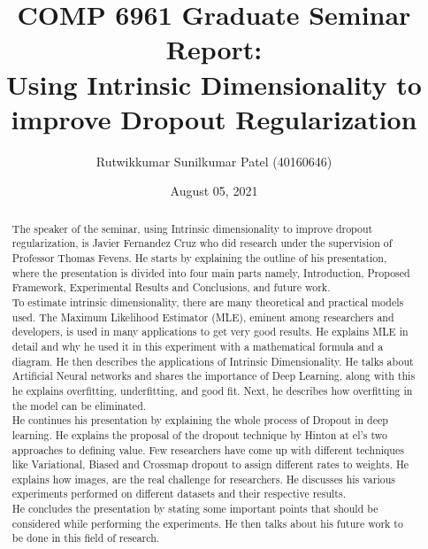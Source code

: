 \documentclass[12pt,letterpaper]{report}
\begin{document}
\title{COMP	6961 Graduate Seminar Report:\\[.5em]

Using Intrinsic Dimensionality to improve Dropout Regularization }
\author{Rutwikkumar Sunilkumar Patel (40160646) }
\date{August 05, 2021}
\maketitle




\begin{abstract}
    
The speaker of the seminar, using Intrinsic dimensionality to improve dropout regularization, is Javier Fernandez Cruz who did research under the supervision of Professor Thomas Fevens. He starts by explaining the outline of his presentation, where the presentation is divided into four main parts namely, Introduction, Proposed Framework, Experimental Results and Conclusions, and future work.  \\

To estimate intrinsic dimensionality, there are many theoretical and practical models used. The Maximum Likelihood Estimator (MLE), eminent among researchers and developers, is used in many applications to get very good results. He explains MLE in detail and why he used it in this experiment with a mathematical formula and a diagram. He then describes the applications of Intrinsic Dimensionality. He talks about Artificial Neural networks and shares the importance of Deep Learning, along with this he explains overfitting, underfitting, and good fit. Next, he describes how overfitting in the model can be eliminated.\\

He continues his presentation by explaining the whole process of Dropout in deep learning. He explains the proposal of the dropout technique by Hinton at el’s two approaches to defining value. Few researchers have come up with different techniques like Variational, Biased and Crossmap dropout to assign different rates to weights. He explains how images, are the real challenge for researchers. He discusses his various experiments performed on different datasets and their respective results. \\

He concludes the presentation by stating some important points that should be considered while performing the experiments. He then talks about his future work to be done in this field of research.

\end{abstract}    
\end{document}
